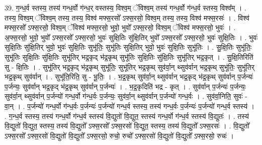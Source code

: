\documentclass[17pt]{extarticle}
\begin{document}
39. ग॒न्ध॒र्व स्तस्य॒ तस्य॑ गन्ध॒र्वो ग॑न्ध॒र् वस्तस्य॒ विश्व॒म् ॅविश्व॒म् तस्य॑ गन्ध॒र्वो ग॑न्ध॒र्व स्तस्य॒ विश्व᳚म् । . तस्य॒ विश्व॒म् ॅविश्व॒म् तस्य॒ तस्य॒ विश्व॑ मफ्स॒रसो᳚ ऽफ्स॒रसो॒ विश्व॒म् तस्य॒ तस्य॒ विश्व॑ मफ्स॒रसः॑ । . विश्व॑ मफ्स॒रसो᳚ ऽफ्स॒रसो॒ विश्व॒म् ॅविश्व॑ मफ्स॒रसो॒ भुवो॒ भुवो᳚ ऽफ्स॒रसो॒ विश्व॒म् ॅविश्व॑ मफ्स॒रसो॒ भुवः॑ । . अ॒फ्स॒रसो॒ भुवो॒ भुवो᳚ ऽफ्स॒रसो᳚ ऽफ्स॒रसो॒ भुवः॑ सुक्षि॒तिः सु॑क्षि॒तिर् भुवो᳚ ऽफ्स॒रसो᳚ ऽफ्स॒रसो॒ भुवः॑ सुक्षि॒तिः । . भुवः॑ सुक्षि॒तिः सु॑क्षि॒तिर् भुवो॒ भुवः॑ सुक्षि॒तिः सुभू॑तिः॒ सुभू॑तिः सुक्षि॒तिर् भुवो॒ भुवः॑ सुक्षि॒तिः सुभू॑तिः । . सु॒क्षि॒तिः सुभू॑तिः॒ सुभू॑तिः सुक्षि॒तिः सु॑क्षि॒तिः सुभू॑तिर् भद्र॒कृद् भ॑द्र॒कृथ् सुभू॑तिः सुक्षि॒तिः सु॑क्षि॒तिः सुभू॑तिर् भद्र॒कृत् । . सु॒क्षि॒तिरिति॑ सु - क्षि॒तिः । . सुभू॑तिर् भद्र॒कृद् भ॑द्र॒कृथ् सुभू॑तिः॒ सुभू॑तिर् भद्र॒कृथ् सुव॑र्वा॒न् थ्सुव॑र्वान् भद्र॒कृथ् सुभू॑तिः॒ सुभू॑तिर् भद्र॒कृथ् सुव॑र्वान् । . सुभू॑ति॒रिति॒ सु - भू॒तिः॒ । . भ॒द्र॒कृथ् सुव॑र्वा॒न् थ्सुव॑र्वान् भद्र॒कृद् भ॑द्र॒कृथ् सुव॑र्वान् प॒र्जन्यः॑ प॒र्जन्यः॒ सुव॑र्वान् भद्र॒कृद् भ॑द्र॒कृथ् सुव॑र्वान् प॒र्जन्यः॑ । . भ॒द्र॒कृदिति॑ भद्र - कृत् । . सुव॑र्वान् प॒र्जन्यः॑ प॒र्जन्यः॒ सुव॑र्वा॒न् थ्सुव॑र्वान् प॒र्जन्यो॑ गन्ध॒र्वो ग॑न्ध॒र्वः प॒र्जन्यः॒ सुव॑र्वा॒न् थ्सुव॑र्वान् प॒र्जन्यो॑ गन्ध॒र्वः । . सुव॑र्वा॒निति॒ सुवः॑ - वा॒न् । . प॒र्जन्यो॑ गन्ध॒र्वो ग॑न्ध॒र्वः प॒र्जन्यः॑ प॒र्जन्यो॑ गन्ध॒र्व स्तस्य॒ तस्य॑ गन्ध॒र्वः प॒र्जन्यः॑ प॒र्जन्यो॑ गन्ध॒र्व स्तस्य॑ । . ग॒न्ध॒र्व स्तस्य॒ तस्य॑ गन्ध॒र्वो ग॑न्ध॒र्व स्तस्य॑ वि॒द्युतो॑ वि॒द्युत॒ स्तस्य॑ गन्ध॒र्वो ग॑न्ध॒र्व स्तस्य॑ वि॒द्युतः॑ । . तस्य॑ वि॒द्युतो॑ वि॒द्युत॒ स्तस्य॒ तस्य॑ वि॒द्युतो᳚ ऽफ्स॒रसो᳚ ऽफ्स॒रसो॑ वि॒द्युत॒ स्तस्य॒ तस्य॑ वि॒द्युतो᳚ ऽफ्स॒रसः॑ । . वि॒द्युतो᳚ ऽफ्स॒रसो᳚ ऽफ्स॒रसो॑ वि॒द्युतो॑ वि॒द्युतो᳚ ऽफ्स॒रसो॒ रुचो॒ रुचो᳚ ऽफ्स॒रसो॑ वि॒द्युतो॑ वि॒द्युतो᳚ ऽफ्स॒रसो॒ रुचः॑ । \newline
\end{document}
